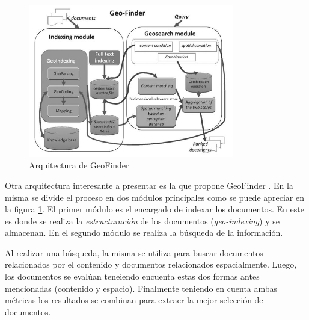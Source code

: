 \begin{figure}[htb]%
	\begin{center}
		\includegraphics[width=0.8\textwidth]{geofinder_arch.jpg}
	\end{center}
	\caption{Arquitectura de GeoFinder \cite{bordogna2012}}
	\label{fig:archgeofinder}
\end{figure}

Otra arquitectura interesante a presentar es la que propone GeoFinder
\cite{bordogna2012}. En la misma se divide el proceso en dos módulos principales
como se puede apreciar en la figura \ref{fig:archgeofinder}. El primer módulo es
el encargado de indexar los documentos. En este es donde se realiza la
\emph{estructuración} de los documentos (\emph{geo-indexing}) y se almacenan.
En el segundo módulo se realiza la búsqueda de la información.

Al realizar una búsqueda, la misma se utiliza para buscar documentos
relacionados por el contenido y documentos relacionados espacialmente. Luego,
los documentos se evalúan teneiendo encuenta estas dos formas antes mencionadas
(contenido y espacio). Finalmente teniendo en cuenta ambas métricas los
resultados se combinan para extraer la mejor selección de documentos.

\clearpage

